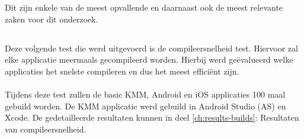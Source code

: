 Dit zijn enkele van de meest opvallende en daarnaast ook de meest relevante zaken voor dit onderzoek.

\subsection{}
\label{sec:M-test-compileersnelheid}
Deze volgende test die werd uitgevoerd is de compileersnelheid test. Hiervoor zal elke applicatie meermaals gecompileerd worden. Hierbij werd geëvalueerd welke applicaties het snelste compileren en dus het meest efficiënt zijn.
\\ \\
Tijdens deze test zullen de basic KMM, Android en iOS applicaties 100 maal gebuild worden. De KMM applicatie werd gebuild in Android Studio (AS) en Xcode. De gedetailleerde resultaten kunnen in deel \ref{ch:results-builds}: Resultaten van compileersnelheid.

